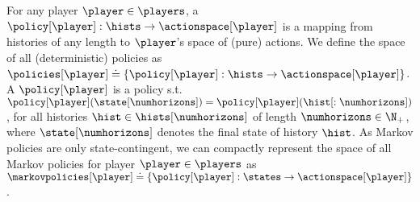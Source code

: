 % 
For any player $\player \in \players$,
a  $\policy[\player]: \hists \to \actionspace[\player]$ is a mapping from histories of any length to $\player$'s space of (pure) actions.
We define the space of all (deterministic) policies as $\policies[\player] \doteq \{ \policy[\player]: \hists \to \actionspace[\player] \}$.
% 
A  \cite{maskin2001markov} $\policy[\player]$ is a 
policy s.t.\@ $\policy[\player] (\state[\numhorizons]) = \policy[\player] (\hist[: \numhorizons])$, 
for all histories $\hist \in \hists[\numhorizons]$ of length $\numhorizons \in \N_+$, where $\state[\numhorizons]$ denotes the final state of history $\hist$. 
As Markov policies are only state-contingent, we can compactly represent the space of all Markov policies for player $\player \in \players$ as $\markovpolicies[\player] \doteq \{ \policy[\player]: \states \to \actionspace[\player] \}$.

